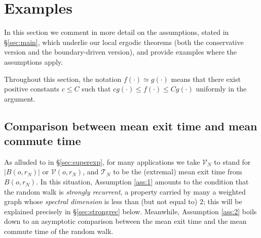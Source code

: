 \documentclass[11pt]{amsart}
\theoremstyle{plain}
\theoremstyle{definition}
\theoremstyle{remark}
\begin{document}
\section{Examples}
\label{sec:examples}

In this section we comment in more detail on the assumptions, stated in \S\ref{sec:main}, which underlie our local ergodic theorems (both the conservative version and the boundary-driven version), and provide examples where the assumptions apply. 

Throughout this section, the notation $f(\cdot) \simeq g(\cdot)$ means that there exist positive constants $c\leq C$ such that $cg(\cdot) \leq f(\cdot) \leq Cg(\cdot)$ uniformly in the argument.


\subsection{Comparison between mean exit time and mean commute time}

As alluded to in \S\ref{sec:superexp}, for many applications we take $\mathcal{V}_N$ to stand for $|B(o, r_N)|$ or $\mathcal{V}(o, r_N)$, and $\mathcal{T}_N$ to be the (extremal) mean exit time from $B(o,r_N)$. In this situation, Assumption \ref{ass:1} amounts to the condition that the random walk is \emph{strongly recurrent}, a property carried by many a weighted graph whose \emph{spectral dimension} is less than (but not equal to) $2$; this will be explained precisely in \S\ref{sec:strongrec} below. Meanwhile, Assumption \ref{ass:2} boils down to an asymptotic comparison between the mean exit time and the mean commute time of the random walk. 
\end{document}
